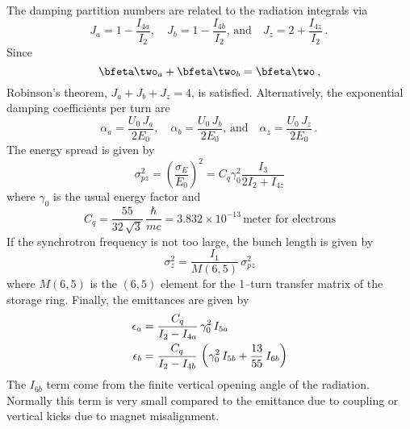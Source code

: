 The damping partition numbers are related to the radiation integrals via
  \begin{equation}
    J_a = 1 - \frac{I_{4a}}{I_2} \comma \quad
    J_b = 1 - \frac{I_{4b}}{I_2} \comma \, \text{and} \quad \label{j1ii}
    J_z = 2 + \frac{I_{4z}}{I_2} \period
  \end{equation}
Since 
  \begin{equation}          
    \bfeta\two_{a} + \bfeta\two_{b} = \bfeta\two
    \comma \label{eee}
  \end{equation}
Robinson's theorem, $J_a + J_b + J_z = 4$, is satisfied.
Alternatively, the exponential damping coefficients per turn are
  \begin{equation}
    \alpha_a = \frac{U_0 \, J_a}{2 E_0} \comma \quad
    \alpha_b = \frac{U_0 \, J_b}{2 E_0} \comma \, \text{and} \quad
    \alpha_z = \frac{U_0 \, J_z}{2 E_0} \period
  \end{equation}
The energy spread is given by
  \begin{equation}
    \sigma_{pz}^2 = \left( \frac{\sigma_E}{E_0} \right)^2 = 
    C_q \gamma_0^2 \frac{I_3}{2I_2 + I_{4z}}
  \end{equation}
where $\gamma_0$ is the usual energy factor and 
  \begin{equation}
    C_q = \frac{55}{32 \, \sqrt{3}} \, \frac{\hbar}{mc} = 
    3.832 \times 10^{-13} \, \text{meter for electrons}
  \end{equation}
If the synchrotron frequency is not too large, the bunch length is given by
  \begin{equation}
    \sigma_z^2 = \frac{I_1}{M(6,5)} \, \sigma_{pz}^2
  \end{equation}
where $M(6,5)$ is the $(6,5)$ element for the 1--turn transfer matrix
of the storage ring. Finally, the emittances are given by
  \begin{align}
    \epsilon_a &= \frac{C_q}{I_2 - I_{4a}} 
      \, \gamma_0^2 \, I_{5a} \nonumber \\
    \epsilon_b &= \frac{C_q}{I_2 - I_{4b}} 
      \, \left( \gamma_0^2 \, I_{5b} + \frac{13}{55} \, I_{6b} \right)
  \end{align}
The $I_{6b}$ term come from the finite vertical opening angle of the
radiation\cite{b:tol}. Normally this term is very small compared to
the emittance due to coupling or vertical kicks due to magnet misalignment.

